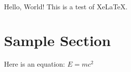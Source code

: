 \documentclass{article}
\begin{document}
Hello, World! This is a test of XeLaTeX.
\section{Sample Section}
Here is an equation:
$
E = mc^2
$
\end{document}
